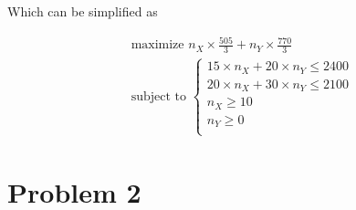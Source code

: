 \documentclass[a4paper, 10pt, twoside]{article}
\begin{document}
Which can be simplified as

\begin{align*}
     & \text{maximize } n_X \times \frac{505}{3} + n_Y \times \frac{770}{3} \\
     & \text{subject to }
    \begin{cases}
        15 \times n_X + 20 \times n_Y \le 2400 \\
        20 \times n_X + 30 \times n_Y \le 2100 \\
        n_X \ge 10                             \\
        n_Y \ge 0                              \\
    \end{cases}
\end{align*}

\section*{Problem 2}
\end{document}
